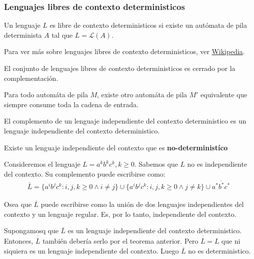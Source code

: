 \subsubsection{Lenguajes libres de contexto deterministicos}
Un lenguaje \(L\) es libre de contexto deterministicos si existe un autómata de pila determinista \(A\) tal que \(L = \mathcal{L}(A)\).

Para ver más sobre lenguajes libres de contexto deterministicos, ver \href{https://www.cubawiki.com.ar/images/f/ff/TLeng_Resumen_Final_2022.pdf}{Wikipedia}.
\begin{lemma}
  El conjunto de lenguajes libres de contexto deterministicos es cerrado por la complementación.
\end{lemma}

\begin{teorema}
  Para todo automáta de pila \(M\), existe otro automáta de pila \(M'\) equivalente que siempre consume toda la cadena de entrada.
\end{teorema}
\begin{teorema}
  El complemento de un lenguaje independiente del contexto deterministico es un lenguaje independiente del contexto deterministico.
\end{teorema}
\begin{teorema}
  Existe un lenguaje independiente del contexto que es \textbf{no-deterministíco}
\end{teorema}
\begin{demo}[0.8\textwidth]
  Consideremos el lenguaje \(L = a^k b^k c^k, k\geq 0\). Sabemos que \(L\) no es independiente del contexto. Su complemento puede escribirse como:
  \begin{align*}
    \bar{L}= \{ a^i b^j c^k : i,j,k \geq 0 \land i \neq j \} \cup \{ a^i b^j c^k : i,j,k \geq 0 \land j \neq k \} \cup \overline{a^* b^* c^*}
  \end{align*}

  Osea que \(\overline{L}\) puede escribirse como la unión de dos lenguajes independientes del contexto y un lenguaje regular. Es, por lo tanto, independiente del contexto.

  Supongamosq que \(\overline{L}\) es un lenguaje independiente del contexto deterministico. Entonces, \(\overline{\overline{L}}\) también debería serlo por el teorema anterior. Pero \(\overline{\overline{L}} = L\) que ni siquiera es un lenguaje independiente del contexto. Luego \(\overline{L}\) no es deterministico.
\end{demo}

